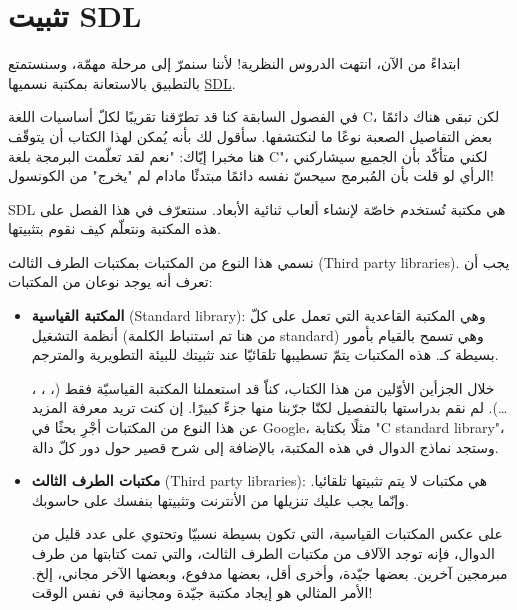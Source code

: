 \chapter{تثبيت \textenglish{SDL}}

ابتداءً من الآن، انتهت الدروس النظرية! لأننا سنمرّ إلى مرحلة مهمّة، وسنستمتع بالتطبيق بالاستعانة بمكتبة نسميها
\underline{\textenglish{SDL}}.

في الفصول السابقة كنا قد تطرّقنا تقريبًا لكلّ أساسيات اللغة
\textenglish{C}،
لكن تبقى هناك دائمًا بعض التفاصيل الصعبة نوعًا ما لنكتشفها. سأقول لك بأنه يُمكن لهذا الكتاب أن يتوقّف هنا مخبرا إيّاك: "نعم لقد تعلّمت البرمجة بلغة 
\textenglish{C}"،
لكني متأكّد بأن الجميع سيشاركني الرأي لو قلت بأن المُبرمج سيحسّ نفسه دائمًا مبتدئًا مادام لم "يخرج" من الكونسول!

\textenglish{SDL}
هي مكتبة تُستخدم خاصّة لإنشاء ألعاب ثنائية الأبعاد. سنتعرّف في هذا الفصل على هذه المكتبة ونتعلّم كيف نقوم بتثبيتها.

نسمي هذا النوع من المكتبات بمكتبات الطرف الثالث 
(\textenglish{Third party libraries}).
يجب أن تعرف أنه يوجد نوعان من المكتبات:

\begin{itemize}
	\item \textbf{المكتبة القياسية}
	(\textenglish{Standard library}):
	وهي المكتبة القاعدية التي تعمل على كلّ أنظمة التشغيل (من هنا تم استنباط الكلمة 
	\textenglish{standard})
	وهي تسمح بالقيام بأمور بسيطة كـ.
	هذه المكتبات يتمّ تسطيبها تلقائيّا عند تثبيتك للبيئة التطويرية والمترجم.
	
	خلال الجزأين الأوّلين من هذا الكتاب، كناّ قد استعملنا المكتبة القياسيّة فقط
(، ، ، \dots).
	لم نقم بدراستها بالتفصيل لكنّا جرّبنا منها جزءً كبيرًا. إن كنت تريد معرفة المزيد عن هذا النوع من المكتبات أجْرِ بحثًا في 
	\textenglish{Google}،
	مثلًا بكتابة
	"\textenglish{C standard library}"،
	وستجد نماذج الدوال في هذه المكتبة، بالإضافة إلى شرح قصير حول دور كلّ دالة.
	\item \textbf{مكتبات الطرف الثالث}
	(\textenglish{Third party libraries}):
	هي مكتبات لا يتم تثبيتها تلقائيا. وإنّما يجب عليك تنزيلها من الأنترنت وتثبيتها بنفسك على حاسوبك.

	على عكس المكتبات القياسية، التي تكون بسيطة نسبيّا وتحتوي على عدد قليل من الدوال، فإنه توجد الآلاف من مكتبات الطرف الثالث، والتي تمت كتابتها من طرف مبرمجين آخرين. بعضها جيّدة، وأخرى أقل، بعضها مدفوع، وبعضها الآخر مجاني، إلخ. الأمر المثالي هو إيجاد مكتبة جيّدة ومجانية في نفس الوقت!
\end{itemize}

